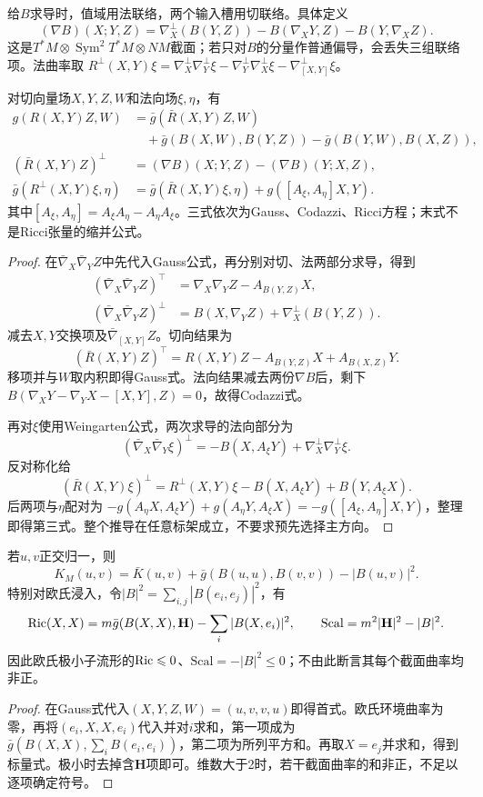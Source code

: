 给$B$求导时，值域用法联络，两个输入槽用切联络。具体定义
\[
 (\nabla B)(X;Y,Z)=\nabla_X^\perp(B(Y,Z))
 -B(\nabla_XY,Z)-B(Y,\nabla_XZ).
\]
这是$T^*M\otimes\operatorname{Sym}^2T^*M\otimes NM$截面；若只对$B$的分量作普通偏导，会丢失三组联络项。法曲率取
$R^\perp(X,Y)\xi=\nabla_X^\perp\nabla_Y^\perp\xi-\nabla_Y^\perp\nabla_X^\perp\xi-\nabla_{[X,Y]}^\perp\xi$。

\begin{theorem}[三组相容方程]\label{thm:gauss-codazzi-ricci}
对切向量场$X,Y,Z,W$和法向场$\xi,\eta$，有
\begin{align*}
 g(R(X,Y)Z,W)&=\bar g(\bar R(X,Y)Z,W)\\
 &\quad+\bar g(B(X,W),B(Y,Z))-\bar g(B(Y,W),B(X,Z)),\\
 (\bar R(X,Y)Z)^\perp&=(\nabla B)(X;Y,Z)-(\nabla B)(Y;X,Z),\\
 \bar g(R^\perp(X,Y)\xi,\eta)&=\bar g(\bar R(X,Y)\xi,\eta)
       +g([A_\xi,A_\eta]X,Y).
\end{align*}
其中$[A_\xi,A_\eta]=A_\xi A_\eta-A_\eta A_\xi$。三式依次为Gauss、Codazzi、Ricci方程；末式不是Ricci张量的缩并公式。
\end{theorem}
\begin{proof}
在$\bar\nabla_X\bar\nabla_YZ$中先代入Gauss公式，再分别对切、法两部分求导，得到
\begin{align*}
 (\bar\nabla_X\bar\nabla_YZ)^\top
   &=\nabla_X\nabla_YZ-A_{B(Y,Z)}X,\\
 (\bar\nabla_X\bar\nabla_YZ)^\perp
   &=B(X,\nabla_YZ)+\nabla_X^\perp(B(Y,Z)).
\end{align*}
减去$X,Y$交换项及$\bar\nabla_{[X,Y]}Z$。切向结果为
\[
 (\bar R(X,Y)Z)^\top=R(X,Y)Z-A_{B(Y,Z)}X+A_{B(X,Z)}Y.
\]
移项并与$W$取内积即得Gauss式。法向结果减去两份$\nabla B$后，剩下
$B(\nabla_XY-\nabla_YX-[X,Y],Z)=0$，故得Codazzi式。

再对$\xi$使用Weingarten公式，两次求导的法向部分为
\[
 (\bar\nabla_X\bar\nabla_Y\xi)^\perp
 =-B(X,A_\xi Y)+\nabla_X^\perp\nabla_Y^\perp\xi.
\]
反对称化给
\[
 (\bar R(X,Y)\xi)^\perp
 =R^\perp(X,Y)\xi-B(X,A_\xi Y)+B(Y,A_\xi X).
\]
后两项与$\eta$配对为
$-g(A_\eta X,A_\xi Y)+g(A_\eta Y,A_\xi X)
=-g([A_\xi,A_\eta]X,Y)$，整理即得第三式。整个推导在任意标架成立，不要求预先选择主方向。
\end{proof}

\begin{corollary}[截面曲率与欧氏缩并]\label{cor:submanifold-curvature-traces}
若$u,v$正交归一，则
\[
 K_M(u,v)=\bar K(u,v)+\bar g(B(u,u),B(v,v))-|B(u,v)|^2.
\]
特别对欧氏浸入，令$|B|^2=\sum_{i,j}|B(e_i,e_j)|^2$，有
\[
 \Ric(X,X)=m\bar g(B(X,X),\mathbf H)-\sum_i|B(X,e_i)|^2,
 \qquad\mathrm{Scal}=m^2|\mathbf H|^2-|B|^2.
\]
因此欧氏极小子流形的$\operatorname{Ric}\leqslant0$、$\mathrm{Scal}=-|B|^2\leq0$；不由此断言其每个截面曲率均非正。
\end{corollary}
\begin{proof}
在Gauss式代入$(X,Y,Z,W)=(u,v,v,u)$即得首式。欧氏环境曲率为零，再将$(e_i,X,X,e_i)$代入并对$i$求和，第一项成为$\bar g(B(X,X),\sum_iB(e_i,e_i))$，第二项为所列平方和。再取$X=e_j$并求和，得到标量式。极小时去掉含$\mathbf H$项即可。维数大于2时，若干截面曲率的和非正，不足以逐项确定符号。
\end{proof}

